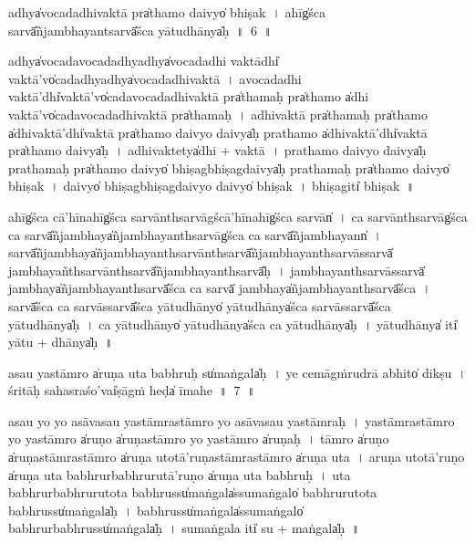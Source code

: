 \documentclass[parskip, DIV=14]{scrartcl}
\begin{document}
{\vspace{0.5cm}

adhya̍vocadadhiva॒ktā pra̍tha॒mo daivyo̍ bhi॒ṣak~।
ahīg̍śca॒ sarvā̎ñja॒mbhaya॒ntsarvā̎śca yātudhā॒nya̍ḥ~॥~6~॥

\vspace{0.5cm}
adhya̍vocadavoca॒dadhyadhya̍vocadadhi va॒ktādhi̍ va॒ktā'vo̍ca॒dadhyadhya̍vocadadhiva॒ktā~। 
a॒vo॒ca॒da॒dhi॒ va॒ktā'dhi̍va॒ktā'vo̍cadavocadadhiva॒ktā pra̍tha॒maḥ pra̍tha॒mo  a̍dhi va॒ktā'vo̍cadavocadadhiva॒ktā pra̍thamaḥ~। %
a॒dhi॒va॒ktā pra̍tha॒maḥ pra̍tha॒mo a̍dhiva॒ktā'dhi̍va॒ktā pra̍tha॒mo daivyo॒ daivya̍ḥ pratha॒mo a̍dhiva॒ktā'dhi̍va॒ktā pra̍tha॒mo daivya̍ḥ~।
a॒dhi॒va॒ktetya̍dhi + va॒ktā~।
pra॒tha॒mo daivyo॒ daivya̍ḥ pratha॒maḥ pra̍tha॒mo daivyo̍ bhi॒ṣagbhi॒ṣagdaivya̍ḥ pratha॒maḥ pra̍tha॒mo daivyo̍ bhi॒ṣak~।
daivyo̍ bhi॒ṣagbhi॒ṣagdaivyo॒ daivyo̍ bhi॒ṣak~।
bhi॒ṣagiti̍  bhi॒ṣak~॥

ahīg̍śca॒ cā'hī॒nahīg̍śca॒ sarvā॒nthsarvā॒g॒ścā'hī॒nahīg̍śca॒ sarvān̍~।
ca॒ sarvā॒nthsarvāg̍śca ca॒ sarvā̎ñja॒mbhaya̍ñja॒mbhaya॒nthsarvāg̍śca ca॒ sarvā̎ñja॒mbhayann̍~।
sarvā̎ñja॒mbhaya̍ñja॒mbhaya॒nthsarvā॒nthsarvā̎ñja॒mbhaya॒nthsarvā॒ssarvā̍ ja॒mbhaya॒ñthsarvā॒nthsarvā̎ñja॒mbhaya॒nthsarvā̎ḥ~।
ja॒mbhaya॒nthsarvā॒ssarvā̍ ja॒mbhaya̍ñja॒mbhaya॒nthsarvā̎śca ca॒ sarvā̍ ja॒mbhaya̍ñja॒mbhaya॒nthsarvā̎śca~।
sarvā̎śca ca॒ sarvā॒ssarvā̎śca yātudhā॒nyo̍ yātudhā॒nya̍śca॒ sarvā॒ssarvā̎śca yātudhā॒nya̍ḥ~।
ca॒ yā॒tu॒dhā॒nyo̍ yātudhā॒nya̍śca ca yātudhā॒nya̍ḥ~।
yā॒tu॒dhā॒nya̍ iti̍ yātu + dhā॒nya̍ḥ~॥ %


\vspace{0.5cm}
a॒sau yastā॒mro a̍ru॒ṇa u॒ta ba॒bhruḥ su̍ma॒ṅgala̍ḥ~।
ye ce॒māgṁru॒drā a॒bhito̍ di॒kṣu~।
 śri॒tāḥ sahasra॒śo'vai̍ṣā॒gṁ॒ heḍa̍ īmahe~॥~7~॥

a॒sau yo yo a॒sāva॒sau yastā॒mrastā॒mro yo a॒sāva॒sau yastā॒mraḥ~।
yastā॒mrastā॒mro yo yastā॒mro a̍ru॒ṇo a̍ru॒ṇastā॒mro yo yastā॒mro a̍ru॒ṇaḥ~।
tā॒mro a̍ru॒ṇo a̍ru॒ṇastā॒mrastā॒mro a̍ru॒ṇa u॒totā'ru॒ṇastā॒mrastā॒mro a̍ru॒ṇa u॒ta~। %
a॒ru॒ṇa u॒totā'ru॒ṇo a̍ru॒ṇa u॒ta ba॒bhrurba॒bhruru॒tā'ruṇo  a̍ru॒ṇa u॒ta ba॒bhruḥ~।
u॒ta ba॒bhrurba॒bhruru॒tota ba॒bhrussu̍ma॒ṅgala̍ssuma॒ṅgalo̍ ba॒bhruru॒tota ba॒bhrussu̍ma॒ṅgala̍ḥ~।
ba॒bhrussu̍ma॒ṅgala̍ssuma॒ṅgalo̍ ba॒bhrurba॒bhrussu̍ma॒ṅgala̍ḥ~।
su॒ma॒ṅgala॒ iti̍ su + ma॒ṅgala̍ḥ~॥

}
\end{document}
